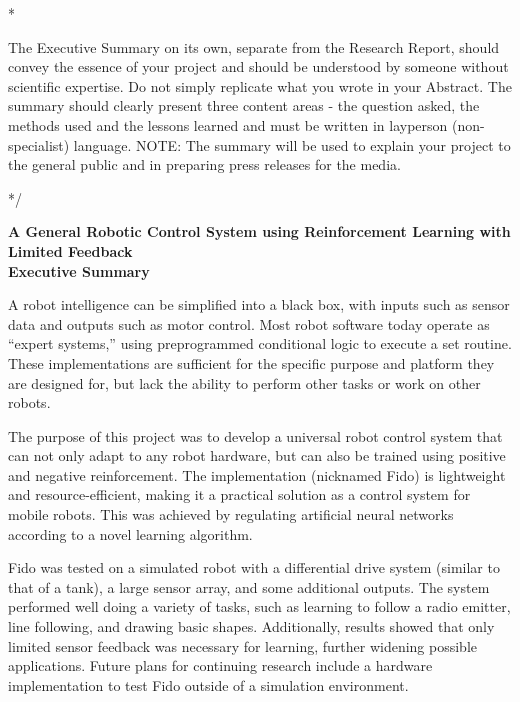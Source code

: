 \documentclass[letterpaper,12pt]{article}
\begin{document}
\/*

The Executive Summary on its own, separate from the Research Report, should convey the essence of your project and should be understood by someone without scientific expertise. Do not simply replicate what you wrote in your Abstract. The summary should clearly present three content areas - the question asked, the methods used and the lessons learned and must be written in layperson (non-specialist) language. NOTE: The summary will be used to explain your project to the general public and in preparing press releases for the media.

*/

\begin{center}
	{\Large
	\textbf{A General Robotic Control System using Reinforcement Learning with Limited Feedback}}\\
	\vspace{1cm}
	{\large \textbf{Executive Summary}}
\end{center}

\noindent

A robot intelligence can be simplified into a black box, with inputs such as sensor data and outputs such as motor control.  Most robot software today operate as ``expert systems,'' using preprogrammed conditional logic to execute a set routine.  These implementations are sufficient for the specific purpose and platform they are designed for, but lack the ability to perform other tasks or work on other robots.

The purpose of this project was to develop a universal robot control system that can not only adapt to any robot hardware, but can also be trained using positive and negative reinforcement.  The implementation (nicknamed Fido) is lightweight and resource-efficient, making it a practical solution as a control system for mobile robots.  This was achieved by regulating artificial neural networks according to a novel learning algorithm.

Fido was tested on a simulated robot with a differential drive system (similar to that of a tank), a large sensor array, and some additional outputs.  The system performed well doing a variety of tasks, such as learning to follow a radio emitter, line following, and drawing basic shapes.  Additionally, results showed that only limited sensor feedback was necessary for learning, further widening possible applications.  Future plans for continuing research include a hardware implementation to test Fido outside of a simulation environment.
\end{document}

